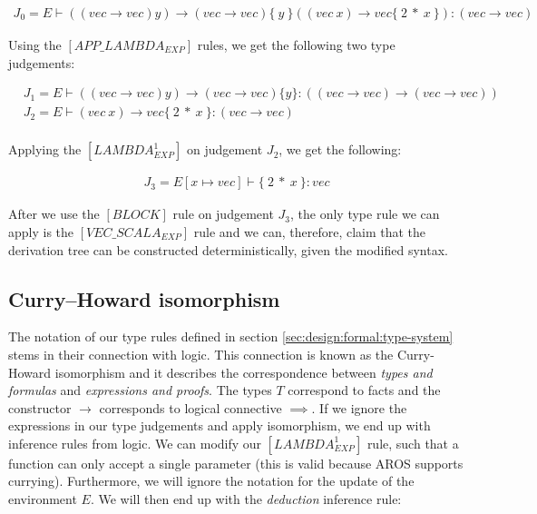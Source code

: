 \begin{align*}
    J_0 = E \vdash ((vec \rightarrow vec) y) \rightarrow (vec \rightarrow vec) \{ \: y \: \}((vec \: x) \rightarrow vec \{ \: 2 \: * \: x \: \}) \colon (vec \rightarrow vec)
\end{align*}

\newblock
\par
Using the $[APP\_LAMBDA_{EXP}]$ rules, we get the following two type judgements:

\begin{align*}
    & J_1 = E \vdash ((vec \rightarrow vec) y) \rightarrow(vec \rightarrow vec)\{y\} \colon ((vec \rightarrow vec) \rightarrow (vec \rightarrow vec)) \\
    & J_2 = E \vdash (vec \: x) \rightarrow vec \{\: 2 \: * \: x \: \} \colon (vec \rightarrow vec)  \\
    &&&
\end{align*}

\newblock
\par 
Applying the $[LAMBDA^1_{EXP}]$ on judgement $J_2$, we get the following:

\begin{align*}
    J_3 = E[x \longmapsto vec] \vdash \{ \: 2 \: * \: x \: \} \colon vec
\end{align*}

\newblock
\par
After we use the $[BLOCK]$ rule on judgement $J_3$, the only type rule we can apply is the $[VEC\_SCALA_{EXP}]$ rule and we can, therefore, claim that the derivation tree can be constructed deterministically, given the modified syntax.

\subsection{Curry–Howard isomorphism}

\newblock
\par
The notation of our type rules defined in section \cref{sec:design:formal:type-system} stems in their connection with logic. This connection is known as the Curry-Howard isomorphism and it describes the correspondence between \textit{types and formulas} and \textit{expressions and proofs}. The types $T$ correspond to facts and the constructor $\rightarrow$ corresponds to logical connective $\implies$. \cite[p. 10]{polymorphic-type-inference} If we ignore the expressions in our type judgements and apply isomorphism, we end up with inference rules from logic. We can modify our $[LAMBDA^1_{EXP}]$ rule, such that a function can only accept a single parameter (this is valid because AROS supports currying). Furthermore, we will ignore the notation for the update of the environment $E$. We will then end up with the \textit{deduction} inference rule:

